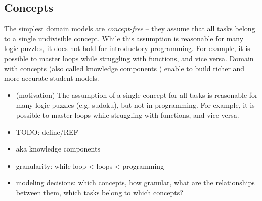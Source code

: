 \subsection{Concepts}

The simplest domain models are \emph{concept-free} -- they assume that all
tasks belong to a single undivisible concept. While this assumption is
reasonable for many logic puzzles, it does not hold for introductory programming.
For example, it is possible to master loops while struggling with functions,
and vice versa.
Domain with concepts (also called knowledge components \cite{knowledge-components})
enable to build richer and more accurate student models.

\begin{itemize}
\item (motivation) The assumption of a single concept for all tasks is
  reasonable for many logic puzzles (e.g. sudoku), but not in programming.
  For example, it is possible to master loops while struggling with functions,
  and vice versa.
\item TODO: define/REF
\item aka knowledge components \cite{knowledge-components}
\item granularity: while-loop < loops < programming
\item modeling decisions: which concepts, how granular, what are the
  relationships between them, which tasks belong to which concepts?
\end{itemize}


